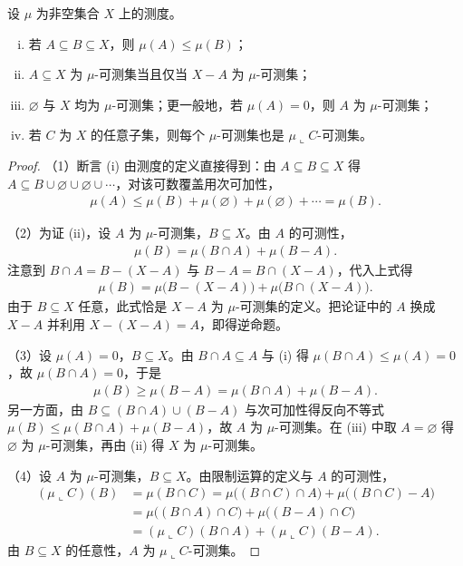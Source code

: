 \documentclass[../../main.tex]{subfiles}
\begin{document}
\begin{theorem}[测度的基本性质]\label{theorem:ch01-1-1}
设 $\mu$ 为非空集合 $X$ 上的测度。
\begin{enumerate}[(i)]
\item 若 $A\subseteq B\subseteq X$，则 $\mu(A)\leqslant\mu(B)$；
\item $A\subseteq X$ 为 $\mu$-可测集当且仅当 $X-A$ 为 $\mu$-可测集；
\item $\varnothing$ 与 $X$ 均为 $\mu$-可测集；更一般地，若 $\mu(A)=0$，则 $A$ 为 $\mu$-可测集；
\item 若 $C$ 为 $X$ 的任意子集，则每个 $\mu$-可测集也是 $\mu\llcorner C$-可测集。
\end{enumerate}
\end{theorem}
\begin{proof}

（1）断言 (i) 由测度的定义直接得到：由 $A\subseteq B\subseteq X$ 得 $A\subseteq B\cup\varnothing\cup\varnothing\cup\cdots$，对该可数覆盖用次可加性，
\begin{align*}
\mu(A)\leqslant\mu(B)+\mu(\varnothing)+\mu(\varnothing)+\cdots=\mu(B).
\end{align*}

（2）为证 (ii)，设 $A$ 为 $\mu$-可测集，$B\subseteq X$。由 $A$ 的可测性，
\begin{align*}
\mu(B)=\mu(B\cap A)+\mu(B-A).
\end{align*}
注意到 $B\cap A=B-(X-A)$ 与 $B-A=B\cap(X-A)$，代入上式得
\begin{align*}
\mu(B)=\mu\bigl(B-(X-A)\bigr)+\mu\bigl(B\cap(X-A)\bigr).
\end{align*}
由于 $B\subseteq X$ 任意，此式恰是 $X-A$ 为 $\mu$-可测集的定义。把论证中的 $A$ 换成 $X-A$ 并利用 $X-(X-A)=A$，即得逆命题。

（3）设 $\mu(A)=0$，$B\subseteq X$。由 $B\cap A\subseteq A$ 与 (i) 得 $\mu(B\cap A)\leqslant\mu(A)=0$，故 $\mu(B\cap A)=0$，于是
\begin{align*}
\mu(B)\geqslant\mu(B-A)=\mu(B\cap A)+\mu(B-A).
\end{align*}
另一方面，由 $B\subseteq(B\cap A)\cup(B-A)$ 与次可加性得反向不等式 $\mu(B)\leqslant\mu(B\cap A)+\mu(B-A)$，故 $A$ 为 $\mu$-可测集。在 (iii) 中取 $A=\varnothing$ 得 $\varnothing$ 为 $\mu$-可测集，再由 (ii) 得 $X$ 为 $\mu$-可测集。

（4）设 $A$ 为 $\mu$-可测集，$B\subseteq X$。由限制运算的定义与 $A$ 的可测性，
\begin{align*}
(\mu\llcorner C)(B)&=\mu(B\cap C)=\mu\bigl((B\cap C)\cap A\bigr)+\mu\bigl((B\cap C)-A\bigr)\\
&=\mu\bigl((B\cap A)\cap C\bigr)+\mu\bigl((B-A)\cap C\bigr)\\
&=(\mu\llcorner C)(B\cap A)+(\mu\llcorner C)(B-A).
\end{align*}
由 $B\subseteq X$ 的任意性，$A$ 为 $\mu\llcorner C$-可测集。
\end{proof}
\end{document}
